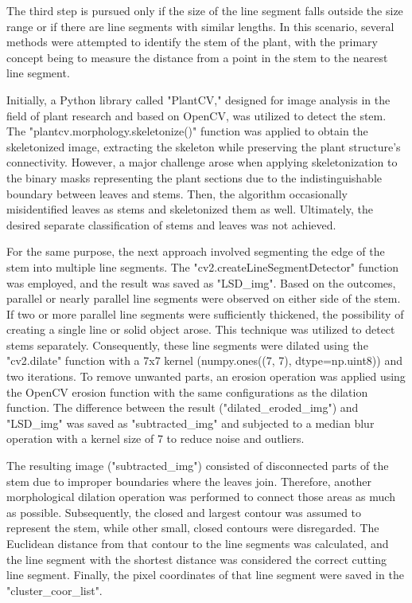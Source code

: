 \documentclass[]{iat}
\begin{document}
\par
The third step is pursued only if the size of the line segment falls outside the size range or if there are line segments with similar lengths. In this scenario, several methods were attempted to identify the stem of the plant, with the primary concept being to measure the distance from a point in the stem to the nearest line segment.
\par
Initially, a Python library called "PlantCV," designed for image analysis in the field of plant research and based on OpenCV, was utilized to detect the stem\cite{PlantCV}. The "plantcv.morphology.skeletonize()" function was applied to obtain the skeletonized image, extracting the skeleton while preserving the plant structure's connectivity. However, a major challenge arose when applying skeletonization to the binary masks representing the plant sections due to the indistinguishable boundary between leaves and stems. Then, the algorithm occasionally misidentified leaves as stems and skeletonized them as well. Ultimately, the desired separate classification of stems and leaves  was not achieved.
\par
For the same purpose, the next approach involved segmenting the edge of the stem into multiple line segments. The "cv2.createLineSegmentDetector" function was employed, and the result was saved as "LSD\_img". Based on the outcomes, parallel or nearly parallel line segments were observed on either side of the stem. If two or more parallel line segments were sufficiently thickened, the possibility of creating a single line or solid object arose. This technique was utilized to detect stems separately. Consequently, these line segments were dilated using the "cv2.dilate" function with a 7x7 kernel (numpy.ones((7, 7), dtype=np.uint8)) and two iterations. To remove unwanted parts, an erosion operation was applied using the OpenCV erosion function with the same configurations as the dilation function. The difference between the result ("dilated\_eroded\_img") and "LSD\_img" was saved as "subtracted\_img" and subjected to a median blur operation with a kernel size of 7 to reduce noise and outliers.
\par
The resulting image ("subtracted\_img") consisted of disconnected parts of the stem due to improper boundaries where the leaves join. Therefore, another morphological dilation operation was performed to connect those areas as much as possible. Subsequently, the closed and largest contour was assumed to represent the stem, while other small, closed contours were disregarded. The Euclidean distance from that contour to the line segments was calculated, and the line segment with the shortest distance was considered the correct cutting line segment. Finally, the pixel coordinates of that line segment were saved in the "cluster\_coor\_list".
\par
\end{document}
